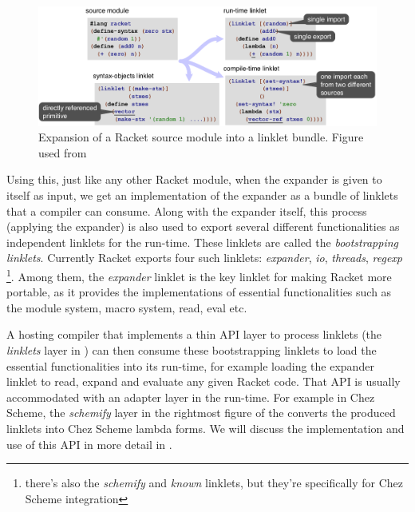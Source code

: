 \begin{figure}[h]
  \centering
  \includegraphics[scale=0.3]{img/racket-expand-example}
  \caption{Expansion of a Racket source module into a linklet
    bundle. Figure used from \cite{racket-on-chez-19}}
  \label{fig:racket-expand-example}
\end{figure}
\vspace{-0.25cm}
Using this, just like any other Racket module, when the expander is
given to itself as input, we get an implementation of the expander as
a bundle of linklets that a compiler can consume. Along with the
expander itself, this process (applying the expander) is also used to
export several different functionalities as independent linklets for
the run-time. These linklets are called the
\emph{bootstrapping linklets}. Currently Racket exports four such
linklets: \emph{expander}, \emph{io}, \emph{threads},
\emph{regexp} \footnote{there's also the \emph{schemify} and
  \emph{known} linklets, but they're specifically for Chez Scheme
  integration}. Among them, the \emph{expander} linklet is the key
linklet for making Racket more portable, as it provides the
implementations of essential functionalities such as the module
system, macro system, read, eval etc.

A hosting compiler that implements a thin API layer to process
linklets (the \emph{linklets} layer in )
can then consume these bootstrapping linklets to load the essential
functionalities into its run-time, for example loading the expander
linklet to read, expand and evaluate any given Racket code. That API
is usually accommodated with an adapter layer in the run-time. For
example in Chez Scheme, the \emph{schemify} layer in the rightmost
figure of the  converts the produced
linklets into Chez Scheme lambda forms. We will discuss the
implementation and use of this API in more detail in
.
